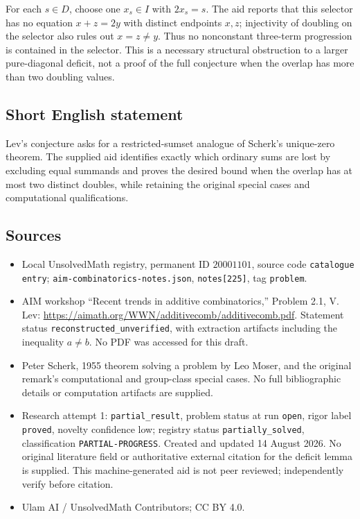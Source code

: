 \documentclass[11pt]{article}
\begin{document}
For each \(s\in D\), choose one \(x_s\in I\) with \(2x_s=s\). The aid reports that this selector has no equation \(x+z=2y\) with distinct endpoints \(x,z\); injectivity of doubling on the selector also rules out \(x=z\ne y\). Thus no nonconstant three-term progression is contained in the selector. This is a necessary structural obstruction to a larger pure-diagonal deficit, not a proof of the full conjecture when the overlap has more than two doubling values.
\subsection{Short English statement}
Lev's conjecture asks for a restricted-sumset analogue of Scherk's unique-zero theorem. The supplied aid identifies exactly which ordinary sums are lost by excluding equal summands and proves the desired bound when the overlap has at most two distinct doubles, while retaining the original special cases and computational qualifications.
\subsection{Sources}
\begin{itemize}
\item Local UnsolvedMath registry, permanent ID \(20001101\), source code \texttt{catalogue entry}; \texttt{aim-combinatorics-notes.json}, \texttt{notes[225]}, tag \texttt{problem}.
\item AIM workshop ``Recent trends in additive combinatorics,'' Problem 2.1, V. Lev: \url{https://aimath.org/WWN/additivecomb/additivecomb.pdf}. Statement status \texttt{reconstructed\_unverified}, with extraction artifacts including the inequality \(a\ne b\). No PDF was accessed for this draft.
\item Peter Scherk, 1955 theorem solving a problem by Leo Moser, and the original remark's computational and group-class special cases. No full bibliographic details or computation artifacts are supplied.
\item Research attempt 1: \texttt{partial\_result}, problem status at run \texttt{open}, rigor label \texttt{proved}, novelty confidence low; registry status \texttt{partially\_solved}, classification \texttt{PARTIAL-PROGRESS}. Created and updated 14 August 2026. No original literature field or authoritative external citation for the deficit lemma is supplied. This machine-generated aid is not peer reviewed; independently verify before citation.
\item Ulam AI / UnsolvedMath Contributors; CC BY 4.0.
\end{itemize}
\end{document}

